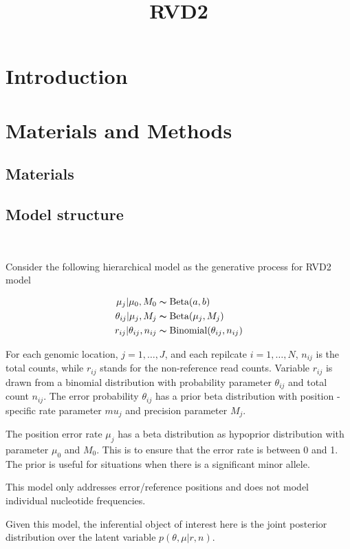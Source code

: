 \documentclass[11pt,reqno]{amsart}
\title{RVD2}
\author{}
\begin{document}
\maketitle

\section{Introduction}

\section{Materials and Methods}

\subsection{Materials}
\subsection{Model structure}\

Consider the following hierarchical model as the generative process for RVD2 model

\begin{align}
\mu_j|\mu_0,M_0 &\thicksim \text{Beta}(a, b)\\
\theta_{ij}|\mu_j,M_j &\thicksim \text{Beta}(\mu_j,M_j)\\
r_{ij}|\theta_{ij},n_{ij} &\thicksim \text{Binomial}(\theta_{ij}, n_{ij})
\end{align}

For each genomic location,  $j=1,\ldots,J$, and each repilcate  $i=1,\ldots,N$, $n_{ij}$ is the total counts, while $r_{ij}$ stands for the non-reference read counts. Variable $r_{ij}$ is drawn from a binomial distribution with probability parameter $\theta_{ij}$ and total count $n_{ij}$.  The error probability $\theta_{ij}$ has a prior beta distribution with position -specific rate parameter $mu_j$ and precision parameter $M_j$.

The position error rate $\mu_j$ has a beta distribution as hypoprior distribution with parameter $\mu_0$ and $M_0$. This is to ensure that the error rate is between 0 and 1. The prior is useful for situations when there is a significant minor allele. 

This model only addresses error/reference positions  and does not model individual nucleotide frequencies.

Given this model, the inferential object of interest here is the joint posterior distribution over the latent variable $p(\theta,\mu|r,n)$.
\end{document}
